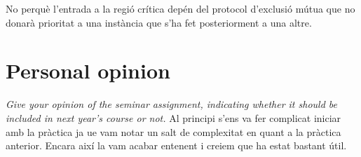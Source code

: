 \documentclass[a4paper, 10pt]{article}
\begin{document}
No perquè l'entrada a la regió crítica depén del protocol d'exclusió mútua que no donarà prioritat a una instància que s'ha fet posteriorment a una altre. 
\newline

\section{Personal opinion}

\textit{Give your opinion of the seminar assignment, indicating whether it should be included in next year's course or not.}
\newline
Al principi s'ens va fer complicat iniciar amb la pràctica ja ue vam notar un salt de complexitat en quant a la pràctica anterior. Encara així la vam acabar entenent i creiem que ha estat bastant útil.
\end{document}
